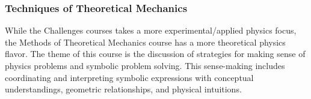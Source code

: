 \documentclass[english,aps,pra,reprint,noshowpacs,superscriptaddress]{revtex4-1}
\begin{document}



\subsubsection{Techniques of Theoretical Mechanics}

While the Challenges courses takes a more experimental/applied physics
focus, the Methods of Theoretical Mechanics course has a more
theoretical physics flavor. The theme of this course is the discussion
of strategies for making sense of physics problems and symbolic
problem solving. This sense-making includes coordinating and
interpreting symbolic expressions with conceptual understandings,
geometric relationships, and physical intuitions.
\end{document}
